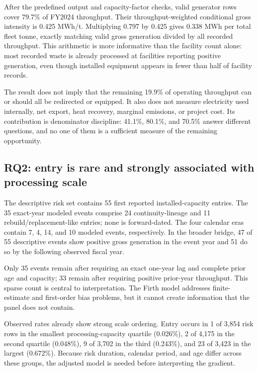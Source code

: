 \documentclass[11pt,letterpaper]{article}
\begin{document}
After the predefined output and capacity-factor checks, valid generator rows
cover 79.7\% of FY2024 throughput. Their throughput-weighted conditional gross
intensity is 0.425 MWh/t. Multiplying 0.797 by 0.425 gives 0.338 MWh per total
fleet tonne, exactly matching valid gross generation divided by all recorded
throughput. This arithmetic is more informative than the facility count alone:
most recorded waste is already processed at facilities reporting positive
generation, even though installed equipment appears in fewer than half of
facility records.

The result does not imply that the remaining 19.9\% of operating throughput can
or should all be redirected or equipped. It also does not measure electricity
used internally, net export, heat recovery, marginal emissions, or project
cost. Its contribution is denominator discipline: 41.1\%, 80.1\%, and 70.5\%
answer different questions, and no one of them is a sufficient measure of the
remaining opportunity.

\subsection{RQ2: entry is rare and strongly associated with processing scale}

The descriptive risk set contains 55 first reported installed-capacity entries.
The 35 exact-year modeled events comprise 24 continuity-lineage and 11
rebuild/replacement-like entries; none is forward-dated. The four calendar eras
contain 7, 4, 14, and 10 modeled events, respectively. In the broader bridge, 47
of 55 descriptive events show positive gross generation in the event year and
51 do so by the following observed fiscal year.

Only 35 events remain after requiring an exact one-year lag and complete prior
age and capacity; 33 remain after requiring positive prior-year throughput.
This sparse count is central to interpretation. The Firth model addresses
finite-estimate and first-order bias problems, but it cannot create information
that the panel does not contain.

Observed rates already show strong scale ordering. Entry occurs in 1 of 3,854
risk rows in the smallest processing-capacity quartile (0.026\%), 2 of 4,175 in
the second quartile (0.048\%), 9 of 3,702 in the third (0.243\%), and 23 of 3,423
in the largest (0.672\%). Because risk duration, calendar period, and age differ
across these groups, the adjusted model is needed before interpreting the
gradient.
\end{document}
